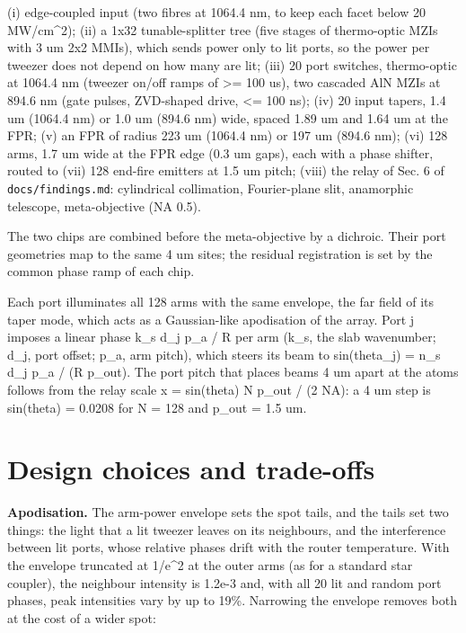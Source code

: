 (i) edge-coupled input (two fibres at 1064.4 nm, to keep each facet
below 20 MW/cm\^{}2); (ii) a 1x32 tunable-splitter tree (five stages of
thermo-optic MZIs with 3 um 2x2 MMIs), which sends power only to lit
ports, so the power per tweezer does not depend on how many are lit;
(iii) 20 port switches, thermo-optic at 1064.4 nm (tweezer on/off ramps
of \textgreater= 100 us), two cascaded AlN MZIs at 894.6 nm (gate
pulses, ZVD-shaped drive, \textless= 100 ns); (iv) 20 input tapers, 1.4
um (1064.4 nm) or 1.0 um (894.6 nm) wide, spaced 1.89 um and 1.64 um at
the FPR; (v) an FPR of radius 223 um (1064.4 nm) or 197 um (894.6 nm);
(vi) 128 arms, 1.7 um wide at the FPR edge (0.3 um gaps), each with a
phase shifter, routed to (vii) 128 end-fire emitters at 1.5 um pitch;
(viii) the relay of Sec. 6 of \texttt{docs/findings.md}: cylindrical
collimation, Fourier-plane slit, anamorphic telescope, meta-objective
(NA 0.5).

The two chips are combined before the meta-objective by a dichroic.
Their port geometries map to the same 4 um sites; the residual
registration is set by the common phase ramp of each chip.

Each port illuminates all 128 arms with the same envelope, the far field
of its taper mode, which acts as a Gaussian-like apodisation of the
array. Port j imposes a linear phase k\_s d\_j p\_a / R per arm (k\_s,
the slab wavenumber; d\_j, port offset; p\_a, arm pitch), which steers
its beam to sin(theta\_j) = n\_s d\_j p\_a / (R p\_out). The port pitch
that places beams 4 um apart at the atoms follows from the relay scale x
= sin(theta) N p\_out / (2 NA): a 4 um step is sin(theta) = 0.0208 for N
= 128 and p\_out = 1.5 um.

\hypertarget{3-design-choices-and-trade-offs}{%
\section{Design choices and
trade-offs}\label{twenty_tweezers-3-design-choices-and-trade-offs}}

\textbf{Apodisation.} The arm-power envelope sets the spot tails, and
the tails set two things: the light that a lit tweezer leaves on its
neighbours, and the interference between lit ports, whose relative
phases drift with the router temperature. With the envelope truncated at
1/e\^{}2 at the outer arms (as for a standard star coupler), the
neighbour intensity is 1.2e-3 and, with all 20 lit and random port
phases, peak intensities vary by up to 19\%. Narrowing the envelope
removes both at the cost of a wider spot:

